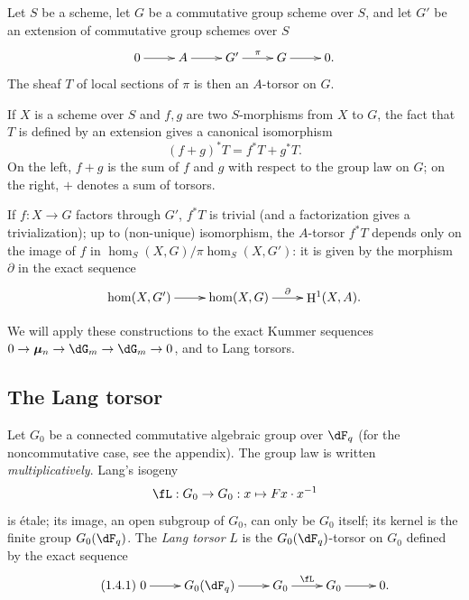 \documentclass[oneside]{book}
\DeclareMathOperator{\h}{H}
\newcommand{\dmu}{{\bm\mu}}
\theoremstyle{sga-source}
\theoremstyle{sga-source-dash}
\theoremstyle{sga-source-dotdash}
\theoremstyle{sga-source-number-note-dash}
\theoremstyle{sga-source-note-number-dotdash}
\theoremstyle{sga-source-example-dotdash}
\theoremstyle{sga-source-inline-number}
\theoremstyle{sga-source-bare-number}
\theoremstyle{sga-source}
\newcommand{\PrintPage}[1]{}\newcommand{\MathPage}[1]{}\newcommand{\PrintCite}[2]{#1}\newcommand{\var}[3]{#2}
\begin{document}
\subsection{}\label{VI:1-3}

Let $S$ be a scheme, let $G$ be a commutative group scheme over $S$, and let $G'$ 
be an extension of commutative group schemes over $S$
\[\xymatrix{
  0 \ar[r] 
    & A \ar[r] 
    & G' \ar[r]^-\pi 
    & G \ar[r] 
    & 0 \text{.}
}\]
The sheaf $T$ of local sections of $\pi$ is then an $A$-torsor on 
$G$. 

\PrintPage{171}
If $X$ is a scheme over $S$ and $f,g$ are two $S$-morphisms from $X$ to $G$, 
the fact that $T$ is defined by an extension gives a canonical isomorphism 
\begin{equation*}\tag{1.3.1}\label{VI:eq:1-3-1}
  (f+g)^\ast T = f^\ast T + g^\ast T \text{.}
\end{equation*}
On the left, $f+g$ is the sum of $f$ and $g$ with respect to the group law on $G$; 
on the right, $+$ denotes a sum of torsors. 

If $f:X\to G$ factors through $G'$, $f^\ast T$ is trivial (and a 
factorization gives a trivialization); up to (non-unique) isomorphism, 
the $A$-torsor $f^\ast T$ depends only on the image of $f$ in 
$\hom_S(X,G)/\pi\hom_S(X,G')$: it is given by the morphism $\partial$ in 
the exact sequence 
\[\xymatrix{
  \hom(X,G') \ar[r] 
    & \hom(X,G) \ar[r]^-\partial 
    & \h^1(X,A) \text{.}
}\]

We will apply these constructions to the exact Kummer sequences 
$0 \to \dmu_n \to \dG_m \to \dG_m \to 0$, and to Lang torsors. 





\subsection{The Lang torsor}\label{VI:1-4}

Let $G_0$ be a connected commutative algebraic group over $\dF_q$ (for the 
noncommutative case, see the appendix). The group law is written 
\emph{multiplicatively}. Lang's isogeny 
\[
\fL:G_0 \to G_0: x\mapsto F x\cdot x^{-1}
\]
is étale; its image, an open subgroup of $G_0$, can only be 
$G_0$ itself; its kernel is the finite group $G_0(\dF_q)$. The \emph{Lang 
torsor} $L$ is the $G_0(\dF_q)$-torsor on $G_0$ defined by the exact sequence 
\begin{equation*}\tag{1.4.1}\label{VI:eq:1-4-1}
\xymatrix{
  0 \ar[r] 
    & G_0(\dF_q) \ar[r] 
    & G_0 \ar[r]^-\fL 
    & G_0 \ar[r] 
    & 0 \text{.}
}
\end{equation*}
\end{document}
